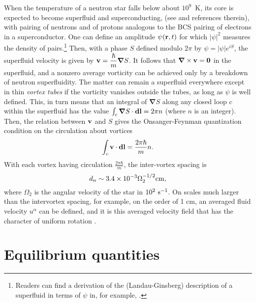 \documentclass[12pt]{article}
\def\be{\begin{equation}}
\def\ee{\end{equation}}
\begin{document}
When the temperature of a neutron star falls below about $10^9$~K, 
its core is expected to become superfluid and superconducting, 
(see \cite{Me98,DH03} and references therein), 
with pairing of neutrons and of protons analogous to the BCS pairing
of electrons in a superconductor.  One can define  
an amplitude $\psi({\bf r},t)$ for which $|\psi|^2$ measures the density 
of pairs.\footnote{Readers can find a derivation of the  
(Landau-Ginsberg) description of a superfluid in terms of $\psi$ 
in, for example, \cite{degennes}.}
Then, with a phase $S$ defined modulo $2\pi$ by $\psi = |\psi|e^{iS}$, 
the superfluid velocity 
is given by $\displaystyle {\bf v}=\frac\hbar m{\bm\nabla} S$.  It follows that
${\bm\nabla}\times\bf v = 0$ in the superfluid, and a nonzero average 
vorticity can be achieved only by a breakdown of neutron superfluidity. 
The matter can remain a superfluid everywhere except in thin {\em vortex 
tubes} if the vorticity vanishes outside the tubes, as long as 
$\psi$ is well defined. This, in turn means that an integral of 
${\bm \nabla} S$ along any closed loop $c$ within the superfluid has the 
value $\int_c {\bm \nabla} S\cdot{\bf dl} = 2\pi n$ (where $n$ is an integer). 
Then, the relation between 
$\bf v$ and $S$ gives the Onsanger-Feynman quantization condition
on the circulation about vortices
\be 
 \int_c {\bf v\cdot dl} = \frac{ 2 \pi \hbar}{ m} n.
\ee
With each vortex having circulation $\frac{ 2 \pi \hbar}{ m}$, the inter-vortex spacing 
is 
\begin{equation}
  d_n \sim 3.4 \times 10^{-3} \Omega_2^{-1/2} {\rm cm},
\end{equation}
where $\Omega_2$ is the angular velocity of the star in   $10^2~{\rm
s}^{-1}$.  On scales much
larger than the intervortex spacing, for example,
on the order of 1 cm, an averaged fluid velocity $u^\alpha$
can be defined, and it is this averaged velocity field 
that has the character of uniform rotation \cite{So87}.


\section{Equilibrium quantities}
\label{sec:equilibrium}
\end{document}
